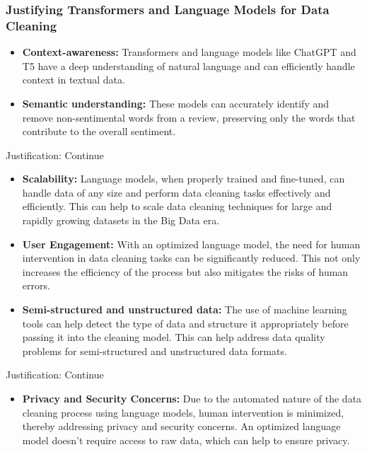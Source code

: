 \documentclass{beamer}
\begin{document}
\begin{frame}
  \frametitle{Justifying Transformers and Language Models for Data Cleaning}

  \begin{itemize}
    \item \textbf{Context-awareness:} Transformers and language models like ChatGPT and T5 have a deep understanding of natural language and can efficiently handle context in textual data.

    \item \textbf{Semantic understanding:} These models can accurately identify and remove non-sentimental words from a review, preserving only the words that contribute to the overall sentiment.

  \end{itemize}

\end{frame}

\begin{frame}{Justification: Continue}
\begin{itemize}
\item \textbf{Scalability:} Language models, when properly trained and fine-tuned, can handle data of any size and perform data cleaning tasks effectively and efficiently. This can help to scale data cleaning techniques for large and rapidly growing datasets in the Big Data era.
    
    \item \textbf{User Engagement:} With an optimized language model, the need for human intervention in data cleaning tasks can be significantly reduced. This not only increases the efficiency of the process but also mitigates the risks of human errors.
    
    \item \textbf{Semi-structured and unstructured data:} The use of machine learning tools can help detect the type of data and structure it appropriately before passing it into the cleaning model. This can help address data quality problems for semi-structured and unstructured data formats.
    
 
\end{itemize}
    
\end{frame}

\begin{frame}{Justification: Continue}

\begin{itemize}
    
    \item \textbf{Privacy and Security Concerns:} Due to the automated nature of the data cleaning process using language models, human intervention is minimized, thereby addressing privacy and security concerns. An optimized language model doesn't require access to raw data, which can help to ensure privacy.

\end{itemize}
\end{frame}
\end{document}
